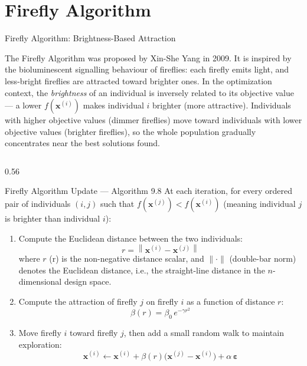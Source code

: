 \documentclass[aspectratio=169,10pt]{beamer}
\newcommand{\bx}{\mathbf{x}}
\newcommand{\norm}[1]{\left\|#1\right\|}
\begin{document}
\section{Firefly Algorithm}

\begin{frame}[allowframebreaks]{Firefly Algorithm: Brightness-Based Attraction}

  The Firefly Algorithm was proposed by Xin-She Yang in 2009.  It
  is inspired by the bioluminescent signalling behaviour of fireflies:
  each firefly emits light, and less-bright fireflies are attracted
  toward brighter ones.  In the optimization context, the
  \emph{brightness} of an individual is inversely related to its
  objective value --- a lower $f(\bx^{(i)})$ makes individual $i$
  brighter (more attractive).  Individuals with higher objective
  values (dimmer fireflies) move toward individuals with lower
  objective values (brighter fireflies), so the whole population
  gradually concentrates near the best solutions found.

  \begin{columns}[T]
    \begin{column}{0.56\textwidth}
      \begin{block}{Firefly Algorithm Update --- Algorithm 9.8}
        At each iteration, for every ordered pair of individuals
        $(i, j)$ such that $f(\bx^{(j)}) < f(\bx^{(i)})$ (meaning
        individual $j$ is brighter than individual $i$):
        \begin{enumerate}
          \item Compute the Euclidean distance between the two
                individuals:
                \[
                  r = \norm{\bx^{(i)} - \bx^{(j)}}
                \]
                where $r$ (r) is the non-negative distance scalar,
                and $\|\cdot\|$ (double-bar norm) denotes the
                Euclidean distance, i.e., the straight-line distance
                in the $n$-dimensional design space.
          \item Compute the attraction of firefly $j$ on firefly $i$
                as a function of distance $r$:
                \[
                  \beta(r) = \beta_0 \, e^{-\gamma r^2}
                \]
          \item Move firefly $i$ toward firefly $j$, then add a small
                random walk to maintain exploration:
                \[
                  \bx^{(i)} \leftarrow \bx^{(i)}
                  + \beta(r)\bigl(\bx^{(j)} - \bx^{(i)}\bigr)
                  + \alpha\,\boldsymbol{\varepsilon}
                \]
        \end{enumerate}
      \end{block}


\end{column}
\end{columns}
\end{frame}
\end{document}
